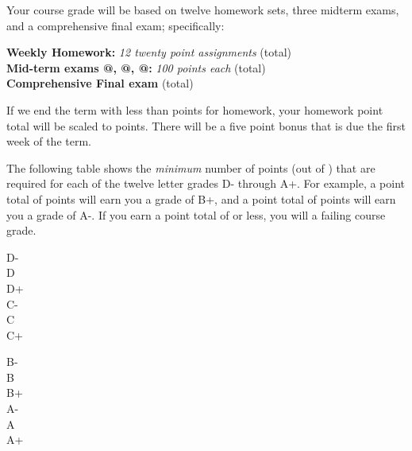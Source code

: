 \documentclass[12pt]{article}
\makeatletter
\newcounter{hw}\setcounter{hw}{0}
\newcommand*{\rom}[1]{\expandafter\@slowromancap\romannumeral #1@}
\newcounter{ex}\setcounter{ex}{0}
\newenvironment{mypar}[2]
  {\begin{list}{}%
    {\setlength\leftmargin{#1}
    \setlength\rightmargin{#2}}
    \item[]}
  {\end{list}}
\makeatother
\begin{document}
Your course grade will be based on twelve homework sets, three midterm exams, and a comprehensive 
final exam; specifically:
\begin{mypar}{0.25in}{0.25in}
    \textbf{Weekly Homework:}  \emph{12 twenty point assignments}  \dotfill \hwpts\/ (total) \\
    \textbf{Mid-term exams \rom{1}, \rom{2}, \rom{3}:} \emph{100 points each}  (total)\\
    \textbf{Comprehensive Final exam}  (total)
\end{mypar}
If we end the term with less than \hwpts\/ points for homework,  
your homework point total will be scaled to \hwpts\/ points. 
There will be a five point bonus that is due the first week of the 
term.






The following table shows the \emph{minimum} number of points (out of \points) that
are required for each of the twelve letter grades D- through A+. For
example, a point total of \Bp\/  points will earn you a grade of B+,  and 
a point total of \Am\/ points will earn you a grade of A-. If you earn a point
total of \F\/  or less, you will a failing course grade.
  \begin{center}
     \begin{minipage}{5.5in}
\begin{mypar}{0.25in}{0.25in}
    \begin{minipage}{2.5in}
        D-  \dotfill \Dm \\
        D \dotfill \D \\
        D+ \dotfill \Dp \\
        C- \dotfill \Cm  \\
        C \dotfill \C \\
        C+ \dotfill \Cp 
        \end{minipage}
    \phantom{xxxxx}
    \begin{minipage}{2.5in}
        B- \dotfill \Bm \\
        B \dotfill  \B \\
        B+ \dotfill  \Bp\\
        A- \dotfill  \Am \\
        A \dotfill  \A \\
        A+ \dotfill  \Ap
    \end{minipage}
\end{mypar} 
\end{minipage}
\end{center}
\end{document}
